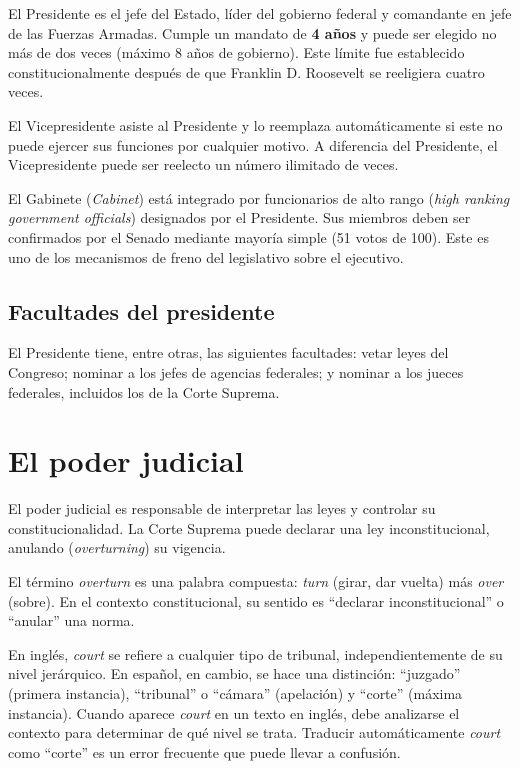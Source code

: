 \documentclass[12pt,oneside]{book}
\begin{document}
El Presidente es el jefe del Estado, líder del gobierno federal y comandante en jefe de las Fuerzas Armadas. Cumple un mandato de \textbf{4 años} y puede ser elegido no más de dos veces (máximo 8 años de gobierno). Este límite fue establecido constitucionalmente después de que Franklin D. Roosevelt se reeligiera cuatro veces.

El Vicepresidente asiste al Presidente y lo reemplaza automáticamente si este no puede ejercer sus funciones por cualquier motivo. A diferencia del Presidente, el Vicepresidente puede ser reelecto un número ilimitado de veces.

El Gabinete (\textit{Cabinet}) está integrado por funcionarios de alto rango (\textit{high ranking government officials}) designados por el Presidente. Sus miembros deben ser confirmados por el Senado mediante mayoría simple (51 votos de 100). Este es uno de los mecanismos de freno del legislativo sobre el ejecutivo.

\subsection{Facultades del presidente}

El Presidente tiene, entre otras, las siguientes facultades: vetar leyes del Congreso; nominar a los jefes de agencias federales; y nominar a los jueces federales, incluidos los de la Corte Suprema.

\section{El poder judicial}
\label{sec:judicial-eeuu}

El poder judicial es responsable de interpretar las leyes y controlar su constitucionalidad. La Corte Suprema puede declarar una ley inconstitucional, anulando (\textit{overturning}) su vigencia.

El término \textit{overturn} es una palabra compuesta: \textit{turn} (girar, dar vuelta) más \textit{over} (sobre). En el contexto constitucional, su sentido es ``declarar inconstitucional'' o ``anular'' una norma.

\begin{important}
En inglés, \textit{court} se refiere a cualquier tipo de tribunal, independientemente de su nivel jerárquico. En español, en cambio, se hace una distinción: ``juzgado'' (primera instancia), ``tribunal'' o ``cámara'' (apelación) y ``corte'' (máxima instancia). Cuando aparece \textit{court} en un texto en inglés, debe analizarse el contexto para determinar de qué nivel se trata. Traducir automáticamente \textit{court} como ``corte'' es un error frecuente que puede llevar a confusión.
\end{important}
\end{document}
